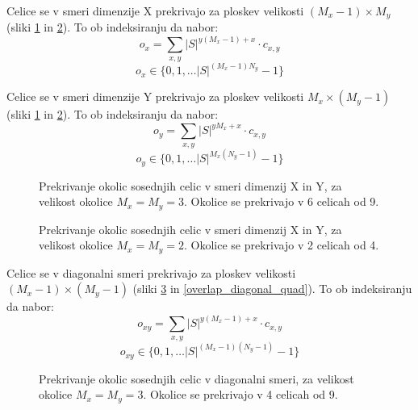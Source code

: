 \documentclass[12pt,a4paper,openany,twoside]{book}
\begin{document}
Celice se v smeri dimenzije X prekrivajo za ploskev velikosti \((M_x-1) \times M_y\) (sliki \ref{overlap_dimension_moore} in \ref{overlap_dimension_quad}).
To ob indeksiranju da nabor:
\begin{equation}
o_x = \sum_{x,y} |S|^{y (M_x-1) + x} \cdot c_{x,y}
\end{equation}
\begin{equation}
o_x \in \{0, 1, \dots |S|^{(M_x-1)N_y}-1\}
\end{equation}

Celice se v smeri dimenzije Y prekrivajo za ploskev velikosti \(M_x \times (M_y-1)\) (sliki \ref{overlap_dimension_moore} in \ref{overlap_dimension_quad}).
To ob indeksiranju da nabor:
\begin{equation}
o_y = \sum_{x,y} |S|^{y M_x + x} \cdot c_{x,y}
\end{equation}
\begin{equation}
o_y \in \{0, 1, \dots |S|^{M_x(N_y-1)}-1\}
\end{equation}

\begin{figure}[htb]
\centerline{}
\caption[Prekrivaje okolic \(3 \times 3\) v smeri dimenzij X in Y.]
{Prekrivanje okolic sosednjih celic v smeri dimenzij X in Y, za velikost okolice \(M_x=M_y=3\).
Okolice se prekrivajo v 6 celicah od 9.}
\label{overlap_dimension_moore}
\end{figure}

\begin{figure}[htb]
\centerline{}
\caption[Prekrivaje okolic \(2 \times 2\) v smeri dimenzij X in Y.]
{Prekrivanje okolic sosednjih celic v smeri dimenzij X in Y, za velikost okolice \(M_x=M_y=2\).
Okolice se prekrivajo v 2 celicah od 4.}
\label{overlap_dimension_quad}
\end{figure}

Celice se v diagonalni smeri prekrivajo za ploskev velikosti \((M_x-1) \times (M_y-1)\) (sliki \ref{overlap_diagonal_moore} in \ref{overlap_diagonal_quad}).
To ob indeksiranju da nabor:
\begin{equation}
o_{xy} = \sum_{x,y} |S|^{y (M_x-1) + x} \cdot c_{x,y}
\end{equation}
\begin{equation}
o_{xy} \in \{0, 1, \dots |S|^{(M_x-1)(N_y-1)}-1\}
\end{equation}

\begin{figure}[htb]
\centerline{}
\caption[Prekrivanje okolic \(3 \times 3\) - diagonalno.]
{Prekrivanje okolic sosednjih celic v diagonalni smeri, za velikost okolice \(M_x=M_y=3\).
Okolice se prekrivajo v 4 celicah od 9.}
\label{overlap_diagonal_moore}
\end{figure}
\end{document}
